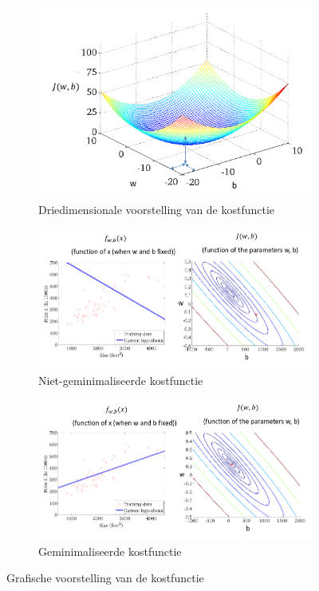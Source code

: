 \begin{figure}[h]
	\centering
	\begin{subfigure}{.5\textwidth}
		\centering
		\includegraphics[width=\textwidth]{images/4-cost-function-3d.png}
		\caption{Driedimensionale voorstelling van de kostfunctie}
		\label{fig:cost-function-3d}
	\end{subfigure}
	\begin{subfigure}{.5\textwidth}
		\centering
		\includegraphics[width=\textwidth]{images/5-cost-function-not-min.png}
		\caption{Niet-geminimaliseerde kostfunctie}
		\label{fig:cost-function-not-min}
	\end{subfigure}
	\begin{subfigure}{.5\textwidth}
		\centering
		\includegraphics[width=\textwidth]{images/6-cost-function-min.png}
		\caption{Geminimaliseerde kostfunctie}
		\label{fig:cost-function-min}
	\end{subfigure}
	\caption{Grafische voorstelling van de kostfunctie}
	\label{fig:cost-function}
\end{figure}
\newpage
